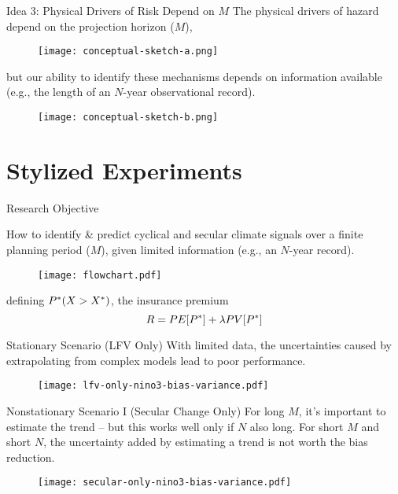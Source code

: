 \documentclass[
  10pt,     %
]{beamer}
\makeatletter
\newcommand*{\eg}{e.g.\@\xspace}
\makeatother
\begin{document}
\begin{frame}{Idea 3: Physical Drivers of Risk Depend on $M$}
  The physical drivers of hazard depend on the projection horizon ($M$),
  \begin{figure}
    \centering
    \texttt{[image: conceptual-sketch-a.png]}\\
  \end{figure}
  \pause
  but our ability to identify these mechanisms depends on information available (\eg, the length of an $N$-year observational record).
  \begin{figure}
    \centering
    \texttt{[image: conceptual-sketch-b.png]}
  \end{figure}
\end{frame}

\section{Stylized Experiments}

\begin{frame}{Research Objective}
  \begin{alertblock}{How to identify \& predict}
    cyclical and secular climate signals over a finite planning period ($M$),  given limited information (\eg, an $N$-year record).
 \end{alertblock}
 \pause
  \begin{figure}
    \texttt{[image: flowchart.pdf]}
  \end{figure}
  defining $P^* \def \mathbb{P} \qty(X > X^*)$, the insurance premium
  \begin{equation*}
    R = \mathbb{E}\qty[ P^*] + \lambda \mathbb{V} \qty[P^*]
  \end{equation*}
\end{frame}

\begin{frame}{Stationary Scenario (LFV Only)}
  With limited data, the uncertainties caused by extrapolating from complex models lead to poor performance.
  \begin{figure}
    \centering
    \texttt{[image: lfv-only-nino3-bias-variance.pdf]}
  \end{figure}
\end{frame}

\begin{frame}{Nonstationary Scenario I (Secular Change Only)}
  For long $M$, it's important to estimate the trend -- but this works well only if $N$ also long.
  For short $M$ and short $N$, the uncertainty added by estimating a trend is not worth the bias reduction.
  \begin{figure}
    \centering
    \texttt{[image: secular-only-nino3-bias-variance.pdf]}
  \end{figure}
\end{frame}
\end{document}
